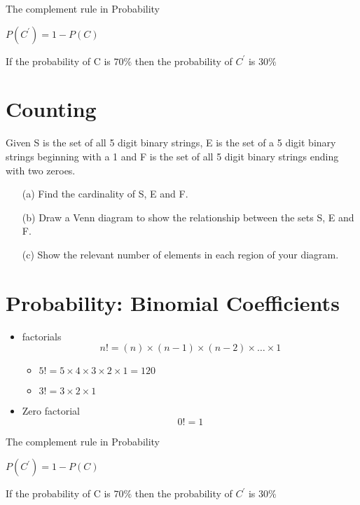 \documentclass[]{report}
\begin{document}

The complement rule in Probability

$P(C^{\prime}) = 1- P(C)$



If the probability of C is $70 \%$ then the probability of $C^{\prime}$ is $30\%$


\section{Counting}
Given S is the set of all 5 digit binary strings, E is the set of a 5 digit
binary strings beginning with a 1 and F is the set of all 5 digit binary strings ending
with two zeroes.
\begin{itemize}
\item[(a)] Find the cardinality of S, E and F.
\item[(b)] Draw a Venn diagram to show the relationship between the sets S, E and F.
\item[(c)] Show the relevant number of elements in each region of your diagram.
\end{itemize}


\section*{Probability: Binomial Coefficients}
\begin{itemize}
\item factorials 
\[ n! = (n)\times (n-1)\times(n-2) \times \ldots \times 1 \]
\begin{itemize}
\item $5! = 5 \times 4 \times 3 \times 2 \times 1 = 120 $
\item $3! = 3 \times 2 \times 1$
\end{itemize}
\item Zero factorial
\[ 0! =  1 \]
\end{itemize}


The complement rule in Probability

$P(C^{\prime}) = 1- P(C)$



If the probability of C is $70 \%$ then the probability of $C^{\prime}$ is $30\%$
\end{document}
